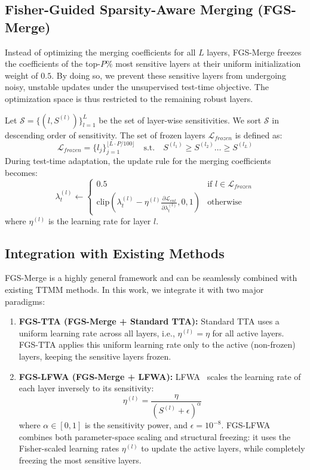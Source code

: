\documentclass{article}
\theoremstyle{plain}
\theoremstyle{definition}
\theoremstyle{remark}
\begin{document}
\subsection{Fisher-Guided Sparsity-Aware Merging (FGS-Merge)}
Instead of optimizing the merging coefficients for all $L$ layers, FGS-Merge freezes the coefficients of the top-$P\%$ most sensitive layers at their uniform initialization weight of $0.5$. By doing so, we prevent these sensitive layers from undergoing noisy, unstable updates under the unsupervised test-time objective. The optimization space is thus restricted to the remaining robust layers.

Let $\mathcal{S} = \{ (l, S^{(l)}) \}_{l=1}^L$ be the set of layer-wise sensitivities. We sort $\mathcal{S}$ in descending order of sensitivity. The set of frozen layers $\mathcal{L}_{frozen}$ is defined as:
\begin{equation}
\mathcal{L}_{frozen} = \{ l_j \}_{j=1}^{\lfloor L \cdot P/100 \rfloor} \quad \text{s.t.} \quad S^{(l_1)} \ge S^{(l_2)} \dots \ge S^{(l_L)}
\end{equation}
During test-time adaptation, the update rule for the merging coefficients becomes:
\begin{equation}
\lambda_{t}^{(l)} \leftarrow \begin{cases}
0.5 & \text{if } l \in \mathcal{L}_{frozen} \\
\text{clip}\left( \lambda_{t}^{(l)} - \eta^{(l)} \frac{\partial \mathcal{L}_{ent}}{\partial \lambda_{t}^{(l)}}, 0, 1 \right) & \text{otherwise}
\end{cases}
\end{equation}
where $\eta^{(l)}$ is the learning rate for layer $l$.

\subsection{Integration with Existing Methods}
FGS-Merge is a highly general framework and can be seamlessly combined with existing TTMM methods. In this work, we integrate it with two major paradigms:
\begin{enumerate}
    \item \textbf{FGS-TTA (FGS-Merge + Standard TTA):} Standard TTA uses a uniform learning rate across all layers, i.e., $\eta^{(l)} = \eta$ for all active layers. FGS-TTA applies this uniform learning rate only to the active (non-frozen) layers, keeping the sensitive layers frozen.
    \item \textbf{FGS-LFWA (FGS-Merge + LFWA):} LFWA~\cite{lfwa_anon2026} scales the learning rate of each layer inversely to its sensitivity:
    \begin{equation}
    \eta^{(l)} = \frac{\eta}{(S^{(l)} + \epsilon)^{\alpha}}
    \end{equation}
    where $\alpha \in [0, 1]$ is the sensitivity power, and $\epsilon = 10^{-8}$. FGS-LFWA combines both parameter-space scaling and structural freezing: it uses the Fisher-scaled learning rates $\eta^{(l)}$ to update the active layers, while completely freezing the most sensitive layers.
\end{enumerate}
\end{document}
